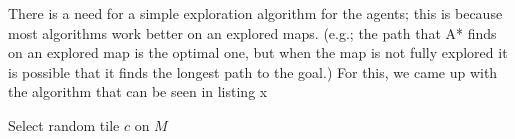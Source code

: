 There is a need for a simple exploration algorithm for the agents; this is because most algorithms work better on an explored maps. (e.g.; the path that A* finds on an explored map is the optimal one, but when the map is not fully explored it is possible that it finds the longest path to the goal.)
For this, we came up with the algorithm that can be seen in listing x

\begin{algorithm}
    Select random tile $c$ on $M$\;
\end{algorithm}